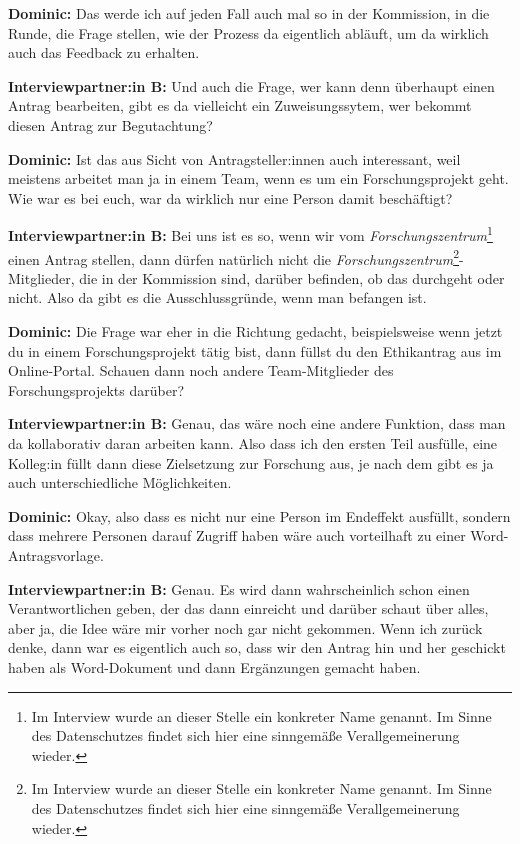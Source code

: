 \documentclass[a4paper,12pt,twoside,numbers=noendperiod]{scrreprt}
\begin{document}
\textbf{Dominic:} Das werde ich auf jeden Fall auch mal so in der Kommission, in die Runde, die Frage stellen, wie der Prozess da eigentlich abläuft, um da wirklich auch das Feedback zu erhalten.

\textbf{Interviewpartner:in B:} Und auch die Frage, wer kann denn überhaupt einen Antrag bearbeiten, gibt es da vielleicht ein Zuweisungssytem, wer bekommt diesen Antrag zur Begutachtung?

\textbf{Dominic:} Ist das aus Sicht von Antragsteller:innen auch interessant, weil meistens arbeitet man ja in einem Team, wenn es um ein Forschungsprojekt geht. Wie war es bei euch, war da wirklich nur eine Person damit beschäftigt?

\textbf{Interviewpartner:in B:} Bei uns ist es so, wenn wir vom \textit{Forschungszentrum}\footnote{Im Interview wurde an dieser Stelle ein konkreter Name genannt. Im Sinne des Datenschutzes findet sich hier eine sinngemäße Verallgemeinerung wieder.} einen Antrag stellen, dann dürfen natürlich nicht die \textit{Forschungszentrum}\footnote{Im Interview wurde an dieser Stelle ein konkreter Name genannt. Im Sinne des Datenschutzes findet sich hier eine sinngemäße Verallgemeinerung wieder.}-Mitglieder, die in der Kommission sind, darüber befinden, ob das durchgeht oder nicht. Also da gibt es die Ausschlussgründe, wenn man befangen ist.

\textbf{Dominic:} Die Frage war eher in die Richtung gedacht, beispielsweise wenn jetzt du in einem Forschungsprojekt tätig bist, dann füllst du den Ethikantrag aus im Online-Portal. Schauen dann noch andere Team-Mitglieder des Forschungsprojekts darüber?

\textbf{Interviewpartner:in B:} Genau, das wäre noch eine andere Funktion, dass man da kollaborativ daran arbeiten kann. Also dass ich den ersten Teil ausfülle, eine Kolleg:in füllt dann diese Zielsetzung zur Forschung aus, je nach dem gibt es ja auch unterschiedliche Möglichkeiten.

\textbf{Dominic:} Okay, also dass es nicht nur eine Person im Endeffekt ausfüllt, sondern dass mehrere Personen darauf Zugriff haben wäre auch vorteilhaft zu einer Word-Antragsvorlage.

\textbf{Interviewpartner:in B:} Genau. Es wird dann wahrscheinlich schon einen Verantwortlichen geben, der das dann einreicht und darüber schaut über alles, aber ja, die Idee wäre mir vorher noch gar nicht gekommen. Wenn ich zurück denke, dann war es eigentlich auch so, dass wir den Antrag hin und her geschickt haben als Word-Dokument und dann Ergänzungen gemacht haben.
\end{document}
